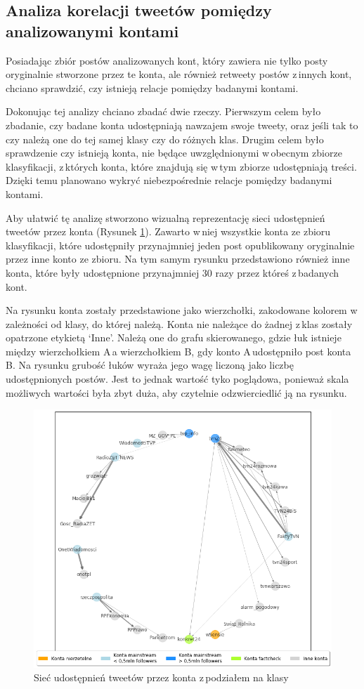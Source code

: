 \subsection{Analiza korelacji tweetów pomiędzy analizowanymi kontami }
Posiadając zbiór postów analizowanych kont, który zawiera nie tylko posty oryginalnie stworzone przez te konta, ale również retweety postów z\,innych kont, chciano sprawdzić, czy istnieją relacje pomiędzy badanymi kontami. 
\par
Dokonując tej analizy chciano zbadać dwie rzeczy. Pierwszym celem było zbadanie, czy badane konta udostępniają nawzajem swoje tweety, oraz jeśli tak to czy należą one do tej samej klasy czy do różnych klas. Drugim celem było sprawdzenie czy istnieją konta, nie będące uwzględnionymi w\,obecnym zbiorze klasyfikacji, z\,których konta, które znajdują się w\,tym zbiorze udostępniają treści. Dzięki temu planowano wykryć niebezpośrednie relacje pomiędzy badanymi kontami.
\par
Aby ułatwić tę analizę stworzono wizualną reprezentację sieci udostępnień tweetów przez konta (Rysunek \ref{fig:connectedaccounts}). Zawarto w\,niej wszystkie konta ze zbioru klasyfikacji, które udostępniły przynajmniej jeden post opublikowany oryginalnie przez inne konto ze zbioru. Na tym samym rysunku przedstawiono również inne konta, które były udostępnione przynajmniej 30 razy przez któreś z\,badanych kont. 
\par
Na rysunku konta zostały przedstawione jako wierzchołki, zakodowane kolorem w\,zależności od klasy, do której należą. Konta nie należące do żadnej z\,klas zostały opatrzone etykietą ‘Inne’. Należą one do grafu skierowanego, gdzie łuk istnieje między wierzchołkiem A\,a wierzchołkiem B, gdy konto A\,udostępniło post konta B. Na rysunku grubość łuków wyraża jego wagę liczoną jako liczbę udostępnionych postów. Jest to jednak wartość tyko poglądowa, ponieważ skala możliwych wartości była zbyt duża, aby czytelnie odzwierciedlić ją na rysunku. 
\begin{figure}[!h]
	\centering \includegraphics[width=1.0\linewidth]{img/results/connectionbetweenaccounts.png}
	\caption{Sieć udostępnień tweetów przez konta z\,podziałem na  klasy} \label{fig:connectedaccounts}
\end{figure}
